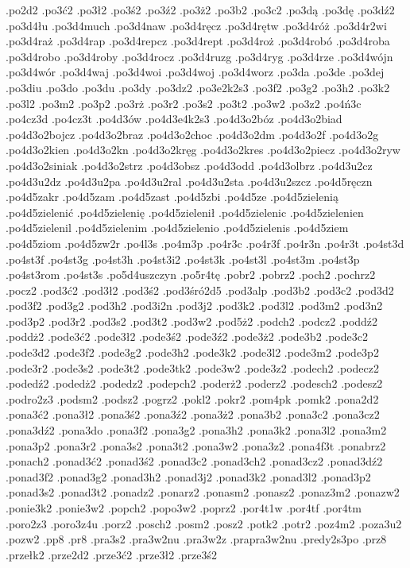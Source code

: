 {.po2d2
.po3ć2
.po3ł2
.po3ś2
.po3ź2
.po3ż2
.po3b2
.po3c2
.po3dą
.po3dę
.po3dź2
.po3d4łu
.po3d4much
.po3d4naw
.po3d4ręcz
.po3d4rętw
.po3d4róż
.po3d4r2wi
.po3d4raż
.po3d4rap
.po3d4repcz
.po3d4rept
.po3d4roż
.po3d4robó
.po3d4roba
.po3d4robo
.po3d4roby
.po3d4rocz
.po3d4ruzg
.po3d4ryg
.po3d4rze
.po3d4wójn
.po3d4wór
.po3d4waj
.po3d4woi
.po3d4woj
.po3d4worz
.po3da
.po3de
.po3dej
.po3diu
.po3do
.po3du
.po3dy
.po3dz2
.po3e2k2s3
.po3f2
.po3g2
.po3h2
.po3k2
.po3l2
.po3m2
.po3p2
.po3rż
.po3r2
.po3s2
.po3t2
.po3w2
.po3z2
.po4ń3c
.po4cz3d
.po4cz3t
.po4d3ów
.po4d3e4k2s3
.po4d3o2bóz
.po4d3o2biad
.po4d3o2bojcz
.po4d3o2braz
.po4d3o2choc
.po4d3o2dm
.po4d3o2f
.po4d3o2g
.po4d3o2kien
.po4d3o2kn
.po4d3o2kręg
.po4d3o2kres
.po4d3o2piecz
.po4d3o2ryw
.po4d3o2siniak
.po4d3o2strz
.po4d3obsz
.po4d3odd
.po4d3olbrz
.po4d3u2cz
.po4d3u2dz
.po4d3u2pa
.po4d3u2ral
.po4d3u2sta
.po4d3u2szcz
.po4d5ręczn
.po4d5zakr
.po4d5zam
.po4d5zast
.po4d5zbi
.po4d5ze
.po4d5zielenią
.po4d5zielenić
.po4d5zielenię
.po4d5zielenił
.po4d5zielenic
.po4d5zielenien
.po4d5zielenil
.po4d5zielenim
.po4d5zielenio
.po4d5zielenis
.po4d5ziem
.po4d5ziom
.po4d5zw2r
.po4l3s
.po4m3p
.po4r3c
.po4r3f
.po4r3n
.po4r3t
.po4st3d
.po4st3f
.po4st3g
.po4st3h
.po4st3i2
.po4st3k
.po4st3l
.po4st3m
.po4st3p
.po4st3rom
.po4st3s
.po5d4uszczyn
.po5r4tę
.pobr2
.pobrz2
.poch2
.pochrz2
.pocz2
.pod3ć2
.pod3ł2
.pod3ś2
.pod3śró2d5
.pod3alp
.pod3b2
.pod3c2
.pod3d2
.pod3f2
.pod3g2
.pod3h2
.pod3i2n
.pod3j2
.pod3k2
.pod3l2
.pod3m2
.pod3n2
.pod3p2
.pod3r2
.pod3s2
.pod3t2
.pod3w2
.pod5ż2
.podch2
.podcz2
.poddź2
.poddż2
.pode3ć2
.pode3ł2
.pode3ś2
.pode3ź2
.pode3ż2
.pode3b2
.pode3c2
.pode3d2
.pode3f2
.pode3g2
.pode3h2
.pode3k2
.pode3l2
.pode3m2
.pode3p2
.pode3r2
.pode3s2
.pode3t2
.pode3tk2
.pode3w2
.pode3z2
.podech2
.podecz2
.podedź2
.podedż2
.podedz2
.podepch2
.poderż2
.poderz2
.podesch2
.podesz2
.podro2z3
.podsm2
.podsz2
.pogrz2
.pokl2
.pokr2
.pom4pk
.pomk2
.pona2d2
.pona3ć2
.pona3ł2
.pona3ś2
.pona3ź2
.pona3ż2
.pona3b2
.pona3c2
.pona3cz2
.pona3dź2
.pona3do
.pona3f2
.pona3g2
.pona3h2
.pona3k2
.pona3l2
.pona3m2
.pona3p2
.pona3r2
.pona3s2
.pona3t2
.pona3w2
.pona3z2
.pona4f3t
.ponabrz2
.ponach2
.ponad3ć2
.ponad3ś2
.ponad3c2
.ponad3ch2
.ponad3cz2
.ponad3dź2
.ponad3f2
.ponad3g2
.ponad3h2
.ponad3j2
.ponad3k2
.ponad3l2
.ponad3p2
.ponad3s2
.ponad3t2
.ponadz2
.ponarz2
.ponasm2
.ponasz2
.ponaz3m2
.ponazw2
.ponie3k2
.ponie3w2
.popch2
.popo3w2
.poprz2
.por4t1w
.por4tf
.por4tm
.poro2z3
.poro3z4u
.porz2
.posch2
.posm2
.posz2
.potk2
.potr2
.poz4m2
.poza3u2
.pozw2
.pp8
.pr8
.pra3s2
.pra3w2nu
.pra3w2z
.prapra3w2nu
.predy2s3po
.prz8
.przełk2
.prze2d2
.prze3ć2
.prze3ł2
.prze3ś2
}
